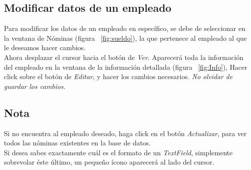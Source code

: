 \documentclass[12pt]{amsart}
\begin{document}
\subsection{Modificar datos de un empleado}
{Para modificar los datos de un empleado en espec\'ifico, se debe de seleccionar en la ventana de N\'ominas (figura ~\ref{fig:sueldo}), la que pertenece al empleado al que le deseamos hacer cambios.}\\
{Ahora desplazar el cursor hacia el bot\'on de \textit{Ver}. Aparecer\'a toda la informaci\'on del empleado en la ventana de la informaci\'on detallada (figura ~\ref{fig:Info}), Hacer click sobre el bot\'on de \textit{Editar}, y hacer los cambios necesarios. \textit{No olvidar de guardar los cambios.}}

\subsection{Nota}
{Si no encuentra al empleado deseado, haga click en el bot\'on \textit{Actualizar}, para ver todos las n\'ominas existentes en la base de datos.}\\
{Si desea sabes exactamente cu\'al es el formato de un \textit{TextField}, simplemente sobrevolar \'este \'ultimo, un peque\~no \'icono aparecer\'a al lado del cursor.}
\end{document}
